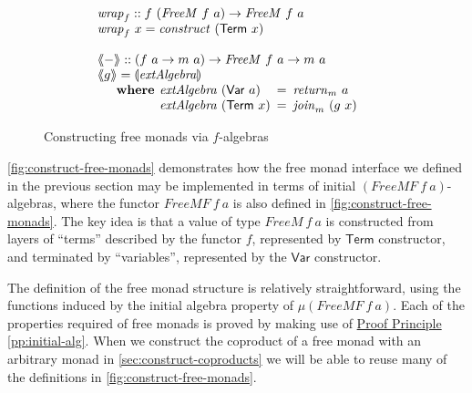 \documentclass{jfp1}
\newcommand{\fold}[1]{\llparenthesis #1 \rrparenthesis}
\newcommand{\fmext}[1]{\langle\kern-0.25em\langle #1 \rangle\kern-0.25em\rangle}
\newcommand{\proofprinref}[1]{\hyperref[#1]{Proof Principle \ref*{#1}}}
\newcommand{\kw}[1]{\textbf{#1}}
\begin{document}
\begin{figure}
\begin{displaymath}
\begin{array}{@{}l}
      \\
      \begin{array}{@{}l}
        \mathit{wrap}_f :: f~(\mathit{FreeM}~f~a) \to \mathit{FreeM}~f~a \\
        \mathit{wrap}_f~x = \mathit{construct}~(\mathsf{Term}~x)
      \end{array} \\
      \\
      \begin{array}{@{}l}
        \fmext{-} :: (f~a \to m~a) \to \mathit{FreeM}~f~a \to m~a \\
        \fmext{g} = \fold{\mathit{extAlgebra}} \\
        \quad\begin{array}{r@{\hspace{0.4em}}l@{\hspace{0.5em}}c@{\hspace{0.5em}}l}
          \kw{where} & \mathit{extAlgebra}~(\mathsf{Var}~a) &=& \mathit{return}_m~a \\
          & \mathit{extAlgebra}~(\mathsf{Term}~x) &=& \mathit{join}_m~(g~x)
        \end{array}
      \end{array}
    \end{array}
  \end{displaymath}
  
  \caption{Constructing free monads via $f$-algebras}
\label{fig:construct-free-monads}
\end{figure}

\autoref{fig:construct-free-monads} demonstrates how the free monad
interface we defined in the previous section may be implemented in
terms of initial $(\mathit{FreeMF}~f~a)$-algebras, where the functor
$\mathit{FreeMF}~f~a$ is also defined in
\autoref{fig:construct-free-monads}. The key idea is that a value of
type $\mathit{FreeM}~f~a$ is constructed from layers of ``terms''
described by the functor $f$, represented by $\mathsf{Term}$
constructor, and terminated by ``variables'', represented by the
$\mathsf{Var}$ constructor.

The definition of the free monad structure is relatively
straightforward, using the functions induced by the initial algebra
property of $\mu (\mathit{FreeMF}~f~a)$. Each of the properties
required of free monads is proved by making use of
\proofprinref{pp:initial-alg}. When we construct the coproduct of a
free monad with an arbitrary monad in
\autoref{sec:construct-coproducts} we will be able to reuse many of
the definitions in \autoref{fig:construct-free-monads}.
\end{document}
